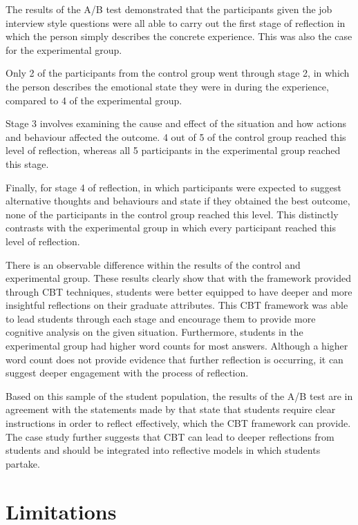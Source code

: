 \documentclass{l4proj}
\begin{document}
The results of the A/B test demonstrated that the participants given the job interview style questions were all able to carry out the first stage of reflection in which the person simply describes the concrete experience. This was also the case for the experimental group. 

Only 2 of the participants from the control group went through stage 2, in which the person describes the emotional state they were in during the experience, compared to 4 of the experimental group.

Stage 3 involves examining the cause and effect of the situation and how actions and behaviour affected the outcome. 4 out of 5 of the control group reached this level of reflection, whereas all 5 participants in the experimental group reached this stage.

Finally, for stage 4 of reflection, in which participants were expected to suggest alternative thoughts and behaviours and state if they obtained the best outcome, none of the participants in the control group reached this level. This distinctly contrasts with the experimental group in which every participant reached this level of reflection.

There is an observable difference within the results of the control and experimental group. These results clearly show that with the framework provided through CBT techniques, students were better equipped to have deeper and more insightful reflections on their graduate attributes. This CBT framework was able to lead students through each stage and encourage them to provide more cognitive analysis on the given situation. Furthermore, students in the experimental group had higher word counts for most answers. Although a higher word count does not provide evidence that further reflection is occurring, it can suggest deeper engagement with the process of reflection. 

Based on this sample of the student population, the results of the A/B test are in agreement with the statements made by \citet{bruno_reflective_2018} that state that students require clear instructions in order to reflect effectively, which the CBT framework can provide. The case study further suggests that CBT can lead to deeper reflections from students and should be integrated into reflective models in which students partake.


\section{Limitations}
\end{document}
